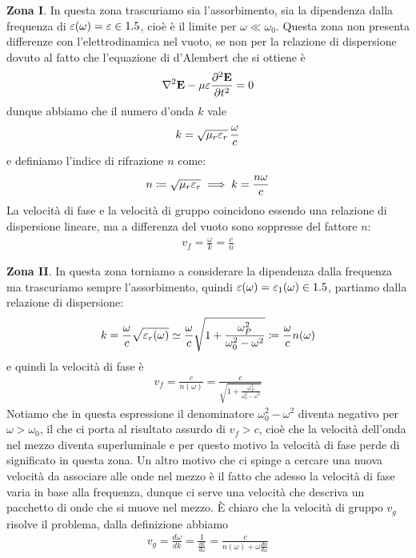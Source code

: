 \textbf{Zona I}. In questa zona trascuriamo sia l'assorbimento, sia la dipendenza dalla frequenza di $ \eps(\omega) = \eps \in \R  $, cioè è il limite per 
$ \omega \ll \omega_0 $. Questa zona non presenta differenze con l'elettrodinamica nel vuoto, se non per la relazione di dispersione dovuto al fatto che 
l'equazione di d'Alembert che si ottiene è
\begin{align}
  \nabla^2 \v{E} - {\mu \eps} \der[2]{\v{E}}{t} = 0
\end{align}
dunque abbiamo che il numero d'onda $ k $ vale
\begin{align}
  k = \sqrt{\mu_r \eps_r} \,\frac{\omega}{c}
\end{align}
e definiamo l'indice di rifrazione $ n $ come:
\begin{align}
  n \coloneq \sqrt{\mu_r \eps_r} \implies k = \frac{n \omega}{c}
\end{align}
La velocità di fase e la velocità di gruppo coincidono essendo una relazione di dispersione lineare, ma a differenza del vuoto sono soppresse del fattore 
$ n $:
\begin{align}
  v_f = \frac{\omega}{k} = \frac{c}{n}
\end{align}


\textbf{Zona II}. In questa zona torniamo a considerare la dipendenza dalla frequenza ma trascuriamo sempre l'assorbimento, quindi 
$ \eps(\omega) = \eps_1(\omega) \in \R $, partiamo dalla relazione di dispersione:
\begin{align}
  k = \frac{\omega}{c} \sqrt{\eps_r(\omega)} \simeq \frac{\omega}{c} \sqrt{1 + \frac{\omega_P^2}{\omega_0^2 - \omega^2 }} \coloneq \frac{\omega}{c} n(\omega)
\end{align}
e quindi la velocità di fase è
\begin{align}
  v_f = \frac{c}{n(\omega)} = \frac{c}{\sqrt{1 + \frac{\omega_P^2}{\omega_0^2 - \omega^2 }}}
\end{align}
Notiamo che in questa espressione il denominatore $ \omega_0^2 - \omega^2 $ diventa negativo per $ \omega > \omega_0 $, il che ci porta al risultato 
assurdo di $ v_f > c $, cioè che la velocità dell'onda nel mezzo diventa superluminale e per questo motivo la velocità di fase perde di significato in 
questa zona. Un altro motivo che ci spinge a cercare una nuova velocità da associare alle onde nel mezzo è il fatto che adesso la velocità di fase varia in 
base alla frequenza, dunque ci serve una velocità che descriva un pacchetto di onde che si muove nel mezzo. È chiaro che la velocità di gruppo $ v_g $ 
risolve il problema, dalla definizione abbiamo 
\begin{align}
  v_g = \frac{d\omega}{dk} = \frac{1}{\frac{dk}{d\omega}} = \frac{c}{n(\omega) + \omega \frac{dn}{d\omega}}
\end{align}

